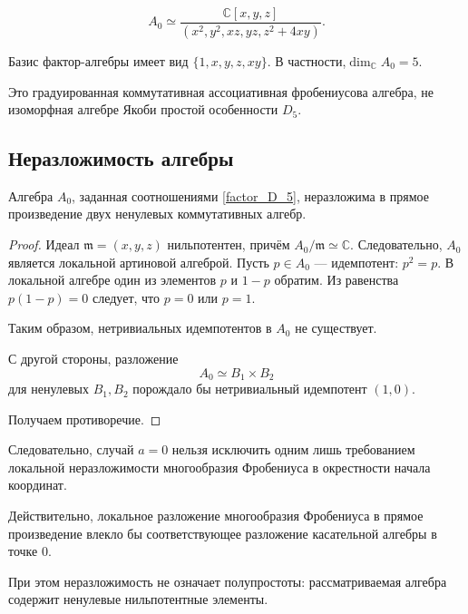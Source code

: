 \begin{equation}
A_0\simeq\dfrac{\mathbb{C}[x,y,z]}
{(x^2,y^2,xz,yz,z^2+4xy)}.
\label{factor_D_5}
\end{equation}

Базис фактор-алгебры имеет вид
\(\{1,x,y,z,xy\}.\)
В частности,\(\dim_{\mathbb C}A_0=5.\)

Это градуированная коммутативная
ассоциативная фробениусова алгебра, не изоморфная алгебре Якоби простой особенности \(D_5\).

\subsection{Неразложимость алгебры}


\begin{prop}
	Алгебра $A_0$, заданная соотношениями \ref{factor_D_5},
	неразложима в прямое произведение двух
	ненулевых коммутативных алгебр.
\end{prop}

\begin{proof}
	Идеал
	\(\mathfrak m=(x,y,z)\) нильпотентен, причём \(A_0/\mathfrak m\simeq\mathbb C.\)	Следовательно, $A_0$ является локальной
	артиновой алгеброй.
	Пусть $p\in A_0$ --- идемпотент: \(p^2=p.\)
	В локальной алгебре один из элементов
	$p$ и $1-p$ обратим.
	Из равенства
	\(p(1-p)=0\) следует, что $p=0$ или $p=1$.
	
	Таким образом, нетривиальных идемпотентов
	в $A_0$ не существует.
	
	С другой стороны, разложение
	\[
	A_0\simeq B_1\times B_2
	\]
	для ненулевых $B_1,B_2$ порождало бы
	нетривиальный идемпотент $(1,0)$.
	
	Получаем противоречие.
\end{proof}

\begin{remark}
	Следовательно, случай $a=0$ нельзя исключить
	одним лишь требованием локальной
	неразложимости многообразия Фробениуса
	в окрестности начала координат.
	
	Действительно, локальное разложение
	многообразия Фробениуса в прямое произведение
	влекло бы соответствующее разложение
	касательной алгебры в точке $0$.
	
	При этом неразложимость не означает
	полупростоты: рассматриваемая алгебра
	содержит ненулевые нильпотентные элементы.
\end{remark}
